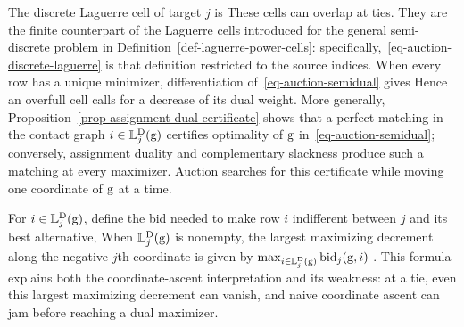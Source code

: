 The discrete Laguerre cell of target $j$ is
These cells can overlap at ties. They are the finite counterpart of the Laguerre cells introduced for the general semi-discrete problem in Definition~\ref{def-laguerre-power-cells}: specifically,~\eqref{eq-auction-discrete-laguerre} is that definition restricted to the source indices. When every row has a unique minimizer, differentiation of~\eqref{eq-auction-semidual} gives
Hence an overfull cell calls for a decrease of its dual weight. More generally, Proposition~\ref{prop-assignment-dual-certificate} shows that a perfect matching in the contact graph $i\in\mathbb{L}_j^{\rm D}(\mathrm{g})$ certifies optimality of $\mathrm{g}$ in~\eqref{eq-auction-semidual}; conversely, assignment duality and complementary slackness produce such a matching at every maximizer. Auction searches for this certificate while moving one coordinate of $\mathrm{g}$ at a time.

For $i\in\mathbb{L}_j^{\rm D}(\mathrm{g})$, define the bid needed to make row $i$ indifferent between $j$ and its best alternative,
When $\mathbb{L}_j^{\rm D}(\mathrm{g})$ is nonempty, the largest maximizing decrement along the negative $j$th coordinate is given by
\(
	\max_{i\in\mathbb{L}_j^{\rm D}(\mathrm{g})}\operatorname{bid}_j(\mathrm{g},i)
\)
	\cite[Lem.~20]{merigot2020optimaltransportalgorithms}. This formula explains both the coordinate-ascent interpretation and its weakness: at a tie, even this largest maximizing decrement can vanish, and naive coordinate ascent can jam before reaching a dual maximizer.

